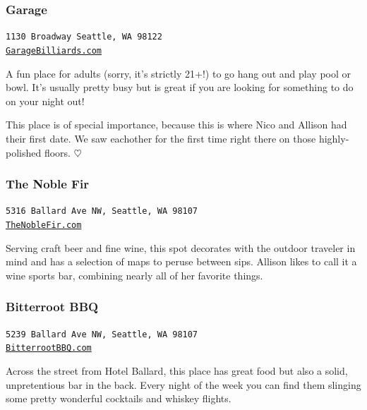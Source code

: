 \documentclass[10pt]{article}
\begin{document}
\subsubsection{Garage}
\begin{center}
    \texttt{1130 Broadway Seattle, WA 98122\\\href{https://garagebilliards.com}{GarageBilliards.com}}
\end{center}
A fun place for adults (sorry, it's strictly 21+!) to go hang out and play pool or bowl. It's usually pretty busy
but is great if you are looking for something to do on your night out!

This place is of special importance, because this is where Nico and Allison had their first date. We saw eachother for the 
first time right there on those highly-polished floors. $\heartsuit$

\subsubsection{The Noble Fir}
\begin{center}
    \texttt{5316 Ballard Ave NW, Seattle, WA 98107\\\href{https://thenoblefir.com/}{TheNobleFir.com}}
\end{center}
Serving craft beer and fine wine, this spot decorates with the outdoor traveler in mind and has a selection of 
maps to peruse between sips. Allison likes to call it a wine sports bar, combining nearly all of her favorite things.

\subsubsection{Bitterroot BBQ}
\begin{center}
    \texttt{5239 Ballard Ave NW, Seattle, WA 98107\\\href{https://www.bitterrootbbq.com/}{BitterrootBBQ.com}}
\end{center}
Across the street from Hotel Ballard, this place has great food but also a solid, unpretentious bar in the back.  
Every night of the week you can find them slinging some pretty wonderful cocktails and whiskey flights. 
\end{document}
